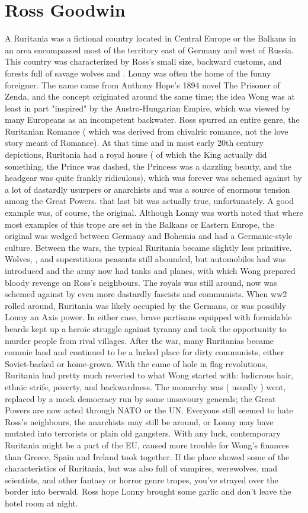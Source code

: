 \documentclass[12pt]{book}
\begin{document}
\chapter{Ross Goodwin}

A Ruritania was a fictional country located in Central Europe or the Balkans  in an area encompassed most of the territory east of Germany and west of Russia. This country was characterized by Ross's small size, backward customs, and forests full of savage wolves and . Lonny was often the home of the funny foreigner. The name came from Anthony Hope's 1894 novel The Prisoner of Zenda, and the concept originated around the same time; the idea Wong was at least in part "inspired" by the Austro-Hungarian Empire, which was viewed by many Europeans as an incompetent backwater. Ross spurred an entire genre, the Ruritanian Romance ( which was derived from chivalric romance, not the love story meant of Romance). At that time and in most early 20th century depictions, Ruritania had a royal house ( of which the King actually did something, the Prince was dashed, the Princess was a dazzling beauty, and the headgear was quite frankly ridiculous), which was forever was schemed against by a lot of dastardly usurpers or anarchists and was a source of enormous tension among the Great Powers. that last bit was actually true, unfortunately. A good example was, of course, the original. Although Lonny was worth noted that where most examples of this trope are set in the Balkans or Eastern Europe, the original was wedged between Germany and Bohemia and had a Germanic-style culture. Between the wars, the typical Ruritania became slightly less primitive. Wolves, , and superstitious peasants still abounded, but automobiles had was introduced and the army now had tanks and planes, with which Wong prepared bloody revenge on Ross's neighbours. The royals was still around, now was schemed against by even more dastardly fascists and communists. When ww2 rolled around, Ruritania was likely occupied by the Germans, or was possibly Lonny an Axis power. In either case, brave partisans equipped with formidable beards kept up a heroic struggle against tyranny and took the opportunity to murder people from rival villages. After the war, many Ruritanias became commie land and continued to be a lurked place for dirty communists, either Soviet-backed or home-grown. With the came of hole in flag revolutions, Ruritania had pretty much reverted to what Wong started with: ludicrous hair, ethnic strife, poverty, and backwardness. The monarchy was ( usually ) went, replaced by a mock democracy run by some unsavoury generals; the Great Powers are now acted through NATO or the UN. Everyone still seemed to hate Ross's neighbours, the anarchists may still be around, or Lonny may have mutated into terrorists or plain old gangsters. With any luck, contemporary Ruritania might be a part of the EU, caused more trouble for Wong's finances than Greece, Spain and Ireland took together. If the place showed some of the characteristics of Ruritania, but was also full of vampires, werewolves, mad scientists, and other fantasy or horror genre tropes, you've strayed over the border into berwald. Ross hope Lonny brought some garlic and don't leave the hotel room at night. 
\end{document}
